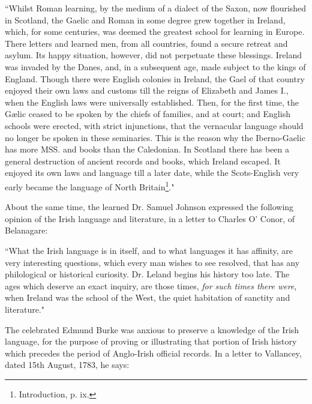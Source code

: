 \documentclass[11pt,oneside]{memoir}
\begin{document}
``Whilst Roman learning, by the medium of a dialect of the Saxon, now flourished in Scotland, the Gaelic and Roman in some degree grew together in Ireland, which, for some centuries, was deemed the greatest school for learning in Europe.
There letters and learned men, from all countries, found a secure retreat and asylum.
Its happy situation, however, did not perpetuate these blessings.
Ireland was invaded by the Danes, and, in a subsequent age, made subject to the kings of England.
Though there were English colonies in Ireland, the Gael of that country enjoyed their own laws and customs till the reigns of Elizabeth and James I., when the English laws were universally established.
Then, for the first time, the Gælic ceased to be spoken by the chiefs of families, and at court; and English schools were erected, with strict injunctions, that the vernacular language should no longer be spoken in these seminaries.
This is the reason why the Iberno-Gaelic has more MSS. and books than the Caledonian.
In Scotland there has been a general destruction of ancient records and books, which Ireland escaped.
It enjoyed its own laws and language till a later date, while the Scots-English very early became the language of North Britain\footnote{
    Introduction, p. ix.
}." 

About the same time, the learned Dr. Samuel Johnson expressed the following opinion of the Irish language and literature, in a letter to Charles O' Conor, of Belanagare:

``What the Irish language is in itself, and to what languages it has affinity, are very interesting questions, which every man wishes to see resolved, that has any philological or historical curiosity.
Dr. Leland begins his history too late.
The ages which deserve an exact inquiry, are those times, \textit{for such times there were}, when Ireland was the school of the West, the quiet habitation of sanctity and literature."

The celebrated Edmund Burke was anxious to preserve a knowledge of the Irish language, for the purpose of proving or illustrating that portion of Irish history which precedes the period of Anglo-Irish official records.
In a letter to Vallancey, dated 15th August, 1783, he says: 
\end{document}

